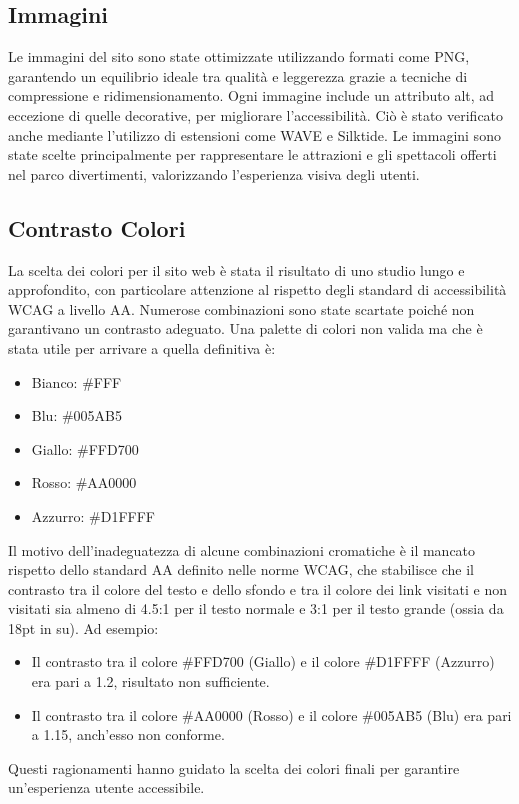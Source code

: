 \subsection{Immagini}
Le immagini del sito sono state ottimizzate utilizzando formati come PNG, garantendo un equilibrio ideale tra qualità e leggerezza grazie a tecniche di compressione e ridimensionamento. Ogni immagine include un attributo alt, ad eccezione di quelle decorative, per migliorare l’accessibilità. Ciò è stato verificato anche mediante l'utilizzo di estensioni come WAVE e Silktide. Le immagini sono state scelte principalmente per rappresentare le attrazioni e gli spettacoli offerti nel  parco divertimenti, valorizzando l’esperienza visiva degli utenti.
\subsection{Contrasto Colori}
La scelta dei colori per il sito web è stata il risultato di uno studio lungo e approfondito, con particolare attenzione al rispetto degli standard di accessibilità WCAG a livello AA. Numerose combinazioni sono state scartate poiché non garantivano un contrasto adeguato.
Una palette di colori non valida ma che è stata utile per arrivare a quella definitiva è:
\begin{itemize}
    \item Bianco: \#FFF
    \item Blu: \#005AB5
    \item Giallo: \#FFD700
    \item Rosso: \#AA0000
    \item Azzurro: \#D1FFFF
\end{itemize}
Il motivo dell'inadeguatezza di alcune combinazioni cromatiche è il mancato rispetto dello standard AA definito nelle norme WCAG, che stabilisce che il contrasto tra il colore del testo e dello sfondo e tra il colore dei link visitati e non visitati sia almeno di 4.5:1 per il testo normale e 3:1 per il testo grande (ossia da 18pt in su).  
Ad esempio: 
\begin{itemize}
    \item Il contrasto tra il colore \#FFD700 (Giallo) e il colore \#D1FFFF (Azzurro) era pari a 1.2, risultato non sufficiente.
    \item Il contrasto tra il colore \#AA0000 (Rosso) e il colore \#005AB5 (Blu) era pari a 1.15, anch'esso non conforme.
\end{itemize}
Questi ragionamenti hanno guidato la scelta dei colori finali per garantire un'esperienza utente accessibile.
